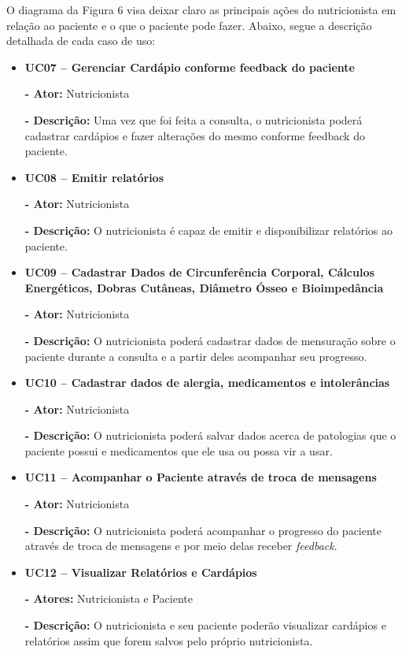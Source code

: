 \documentclass[
	12pt,				%
    oneside,			%
	a4paper,			%
	english,			%
	french,				%
	spanish,			%
	brazil,				%
	]{abntex2}
\begin{document}
O diagrama da Figura 6 visa deixar claro as principais ações do nutricionista
em relação ao paciente e o que o paciente pode fazer. Abaixo, segue a descrição
detalhada de cada caso de uso:

\begin{itemize}
\item \textbf{UC07 – Gerenciar Cardápio conforme feedback do paciente}

\textbf{- Ator:} Nutricionista

\textbf{- Descrição:} Uma vez que foi feita a consulta, o nutricionista poderá cadastrar cardápios e fazer alterações do mesmo conforme feedback do paciente.

\item \textbf{UC08 – Emitir relatórios}

\textbf{- Ator:} Nutricionista

\textbf{- Descrição:} O nutricionista é capaz de emitir e disponibilizar
relatórios ao paciente.

\item \textbf{UC09 – Cadastrar Dados de Circunferência Corporal, Cálculos Energéticos, Dobras Cutâneas, Diâmetro Ósseo e Bioimpedância}

\textbf{- Ator:} Nutricionista

\textbf{- Descrição:} O nutricionista poderá cadastrar dados de mensuração sobre o paciente durante a consulta e a partir deles acompanhar seu progresso.

\item \textbf{UC10 – Cadastrar dados de alergia, medicamentos e intolerâncias}

\textbf{- Ator:} Nutricionista

\textbf{- Descrição:} O nutricionista poderá salvar dados acerca de patologias que o paciente possui e medicamentos que ele usa ou possa vir a usar.

\item \textbf{UC11 – Acompanhar o Paciente através de troca de mensagens}

\textbf{- Ator:} Nutricionista

\textbf{- Descrição:} O nutricionista poderá acompanhar o progresso do paciente através de troca de mensagens e por meio delas receber \textit{feedback}.

\item \textbf{UC12 – Visualizar Relatórios e Cardápios}

\textbf{- Atores:} Nutricionista e Paciente

\textbf{- Descrição:} O nutricionista e seu paciente poderão visualizar cardápios e relatórios assim que forem salvos pelo próprio nutricionista.


\end{itemize}
\end{document}
